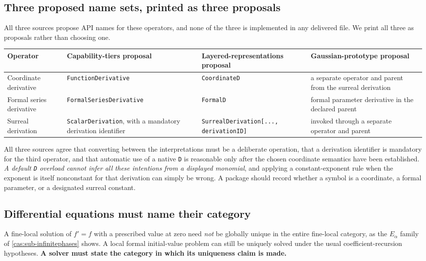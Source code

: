 \documentclass[11pt,letterpaper]{article}
\numberwithin{equation}{section}
\theoremstyle{definition}
\theoremstyle{remark}
\begin{document}
\subsection{Three proposed name sets, printed as three proposals}
\label{cas:sub-derivnames}
All three sources propose API names for these operators, and none of the three
is implemented in any delivered file. We print all three as proposals rather
than choosing one.
\begingroup\small
\begin{longtable}{@{}P{0.19\textwidth}P{0.28\textwidth}P{0.24\textwidth}P{0.19\textwidth}@{}}
\toprule
Operator & Capability-tiers proposal & Layered-representations proposal &
Gaussian-prototype proposal\\
\midrule\endhead
Coordinate derivative & \texttt{FunctionDerivative} & \texttt{CoordinateD} &
a separate operator and parent from the surreal derivation\\[0.4em]
Formal series derivative & \texttt{FormalSeriesDerivative} & \texttt{FormalD} &
formal parameter derivative in the declared parent\\[0.4em]
Surreal derivation & \texttt{ScalarDerivation}, with a mandatory derivation
identifier & \texttt{SurrealDerivation[..., derivationID]} & invoked through a
separate operator and parent\\
\bottomrule
\end{longtable}
\endgroup
All three sources agree that converting between the interpretations must be a
deliberate operation, that a derivation identifier is mandatory for the third
operator, and that automatic use of a native \texttt{D} is reasonable only after
the chosen coordinate semantics have been established. \emph{A default
\texttt{D} overload cannot infer all these intentions from a displayed
monomial}, and applying a constant-exponent rule when the exponent is itself
nonconstant for that derivation can simply be wrong. A package should record
whether a symbol is a coordinate, a formal parameter, or a designated surreal
constant.

\subsection{Differential equations must name their category}
\label{cas:sub-decategory}
A fine-local solution of $f'=f$ with a prescribed value at zero need \emph{not}
be globally unique in the entire fine-local category, as the $E_\alpha$ family
of \cref{cas:sub-infinitephases} shows. A local formal initial-value problem can
still be uniquely solved under the usual coefficient-recursion hypotheses.
\textbf{A solver must state the category in which its uniqueness claim is
made.}
\end{document}
